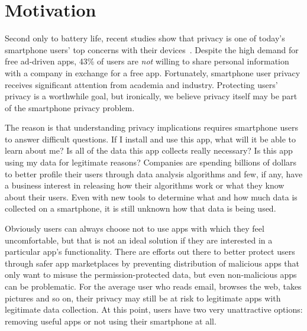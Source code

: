 
\section{Motivation}
\label{sec-motivation}

Second only to battery life, recent studies show that privacy is one of
today's smartphone users' top concerns with their
devices~\cite{truste-privacy}. Despite the high demand for free ad-driven
apps, 43\% of users are \textit{not} willing to share personal information with
a company in exchange for a free app.  Fortunately, smartphone user privacy
receives significant attention from academia and industry. Protecting users'
privacy is a worthwhile goal, but ironically, we believe privacy itself may be
part of the smartphone privacy problem.

The reason is that understanding privacy implications requires smartphone users
to answer difficult questions. If I install and use this app, what will it be
able to learn about me? Is all of the data this app collects really necessary?
Is this app using my data for legitimate reasons? Companies are spending billions of dollars
to better profile their users through data analysis algorithms and few, if any,
have a business interest in releasing how their algorithms work or what they
know about their users. Even with new tools to determine what and how much data
is collected on a smartphone, it is still unknown how that data is being used.

Obviously users can always choose not to use apps with which they feel
uncomfortable, but that is not an ideal solution if they are interested in a
particular app's functionality. There are efforts out there to better protect
users through safer app marketplaces by preventing distribution of malicious apps that
only want to misuse the permission-protected data, but even non-malicious apps
can be problematic. For the average user who reads email, browses the web,
takes pictures and so on, their privacy may still be at risk to legitimate apps
with legitimate data collection. At this point, users have two very
unattractive options: removing useful apps or not using their smartphone
at all.


